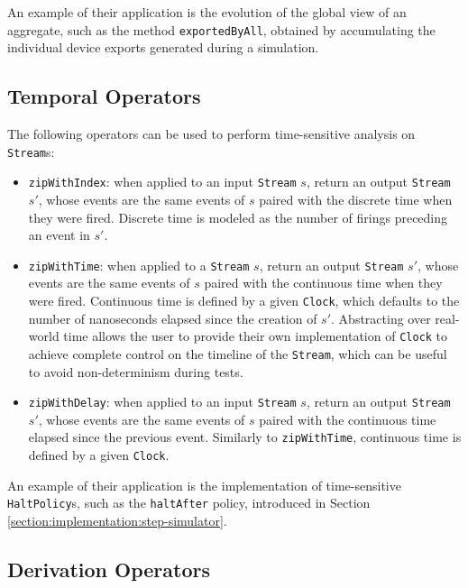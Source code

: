An example of their application is the evolution of the global view of an
aggregate, such as the method \texttt{exportedByAll}, obtained by accumulating
the individual device exports generated during a simulation.

\subsection{Temporal Operators}

The following operators can be used to perform time-sensitive analysis on
\texttt{Stream}s:

\begin{itemize}
  \item \texttt{zipWithIndex}: when applied to an input \texttt{Stream} $s$,
        return an output \texttt{Stream} $s'$, whose events are the same events
        of $s$ paired with the discrete time when they were fired. Discrete
        time is modeled as the number of firings preceding an event in $s'$.
  \item \texttt{zipWithTime}: when applied to a \texttt{Stream} $s$, return an
        output \texttt{Stream} $s'$, whose events are the same events of $s$
        paired with the continuous time when they were fired. Continuous time
        is defined by a given \texttt{Clock}, which defaults to the number of
        nanoseconds elapsed since the creation of $s'$. Abstracting over
        real-world time allows the user to provide their own implementation of
        \texttt{Clock} to achieve complete control on the timeline of the
        \texttt{Stream}, which can be useful to avoid non-determinism during
        tests.
  \item \texttt{zipWithDelay}: when applied to an input \texttt{Stream} $s$,
        return an output \texttt{Stream} $s'$, whose events are the same events
        of $s$ paired with the continuous time elapsed since the previous
        event. Similarly to \texttt{zipWithTime}, continuous time is defined by
        a given \texttt{Clock}.
\end{itemize}

An example of their application is the implementation of time-sensitive
\texttt{Halt\-Policy}s, such as the \texttt{haltAfter} policy, introduced in
Section \ref{section:implementation:step-simulator}.

\subsection{Derivation Operators}

